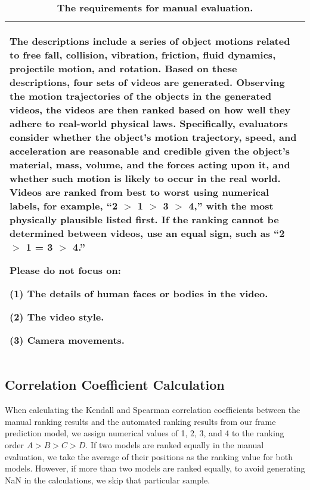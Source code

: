 \begin{table}[ht]
\centering
\setlength{\tabcolsep}{0pt}  %
\fontsize{8}{10}\selectfont
\renewcommand{\arraystretch}{1.0}
\setlength{\fboxsep}{0pt}  %
\colorbox{mycolor}{%
\begin{tabularx}{\columnwidth}{@{}X@{}}  %
\toprule
\sloppy
The descriptions include a series of object motions related to free fall, collision, vibration, friction, fluid dynamics, projectile motion, and rotation. Based on these descriptions, four sets of videos are generated. Observing the motion trajectories of the objects in the generated videos, the videos are then ranked based on how well they adhere to real-world physical laws. Specifically, evaluators consider whether the object's motion trajectory, speed, and acceleration are reasonable and credible given the object's material, mass, volume, and the forces acting upon it, and whether such motion is likely to occur in the real world. Videos are ranked from best to worst using numerical labels, for example, ``2 $>$ 1 $>$ 3 $>$ 4,'' with the most physically plausible listed first. If the ranking cannot be determined between videos, use an equal sign, such as ``2 $>$ 1 = 3 $>$ 4.'' \par
Please do not focus on:\par
(1) The details of human faces or bodies in the video.\par
(2) The video style.\par
(3) Camera movements.\par
\\  %
\bottomrule
\end{tabularx}%
}
\caption{\textbf{The requirements for manual evaluation.}}
\label{tab:manual}
\end{table}

\subsection{Correlation Coefficient Calculation}
When calculating the Kendall and Spearman correlation coefficients between the manual ranking results and the automated ranking results from our frame prediction model, we assign numerical values of 1, 2, 3, and 4 to the ranking order $A > B > C > D$. If two models are ranked equally in the manual evaluation, we take the average of their positions as the ranking value for both models. However, if more than two models are ranked equally, to avoid generating NaN in the calculations, we skip that particular sample.


